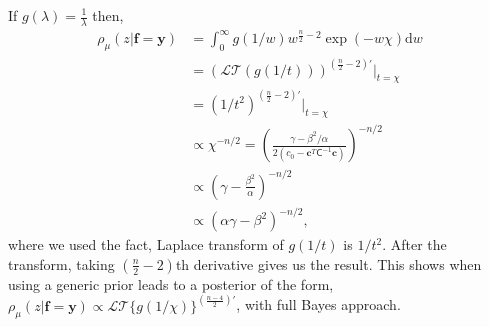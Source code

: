 \documentclass{iitthesis}          %
\newcommand{\bm}[1]{\boldsymbol{#1}}
\newcommand{\D}[1]{\text{d}{#1}}
\newcommand{\vc}{\bm{c}}
\newcommand{\vf}{\bm{f}}
\newcommand{\vy}{\bm{y}}
\newcommand{\mC}{\mathsf{C}}
\begin{document}
If $\displaystyle g(\lambda) = \frac{1}{\lambda}$ then, 
\begin{align*}
{\rho_{\mu}(z | \vf = \vy)} 
&= \int_{0}^\infty g(1/w)  w^{\frac n2 -2}
\exp \left(  - w \chi \right)
\D w
\\
& = \displaystyle \left(\mathcal{LT}(g(1/t)) \right)^{(\frac n2 -2)'} \lvert_{t=\chi}
\\
& = \left(1/t^{2} \right)^{(\frac n2 -2)'} \lvert_{t=\chi}
\\
& \propto \chi^{-n/2} = \left( \frac{  \gamma - \beta^2/\alpha}{2(c_0  -\vc ^T \mC^{-1} \vc)} \right)^{-n/2}
\\
& \propto \left(\gamma - \frac{\beta^2}{\alpha}\right)^{-n/2}
\\
& \propto \left(\alpha \gamma - \beta^2\right)^{-n/2},
\end{align*}
where we used the fact, Laplace transform of $g(1/t)$ is $1/t^2$. After the transform, taking $(\frac n2 -2)$th derivative gives us the result. This shows when using a generic prior leads to a posterior of the form,
$ {\rho_{\mu}(z | \vf = \vy)}  \propto  \mathcal{LT} \{ g(1/\chi) \}^{(\frac{n-4}2)'} $, with full Bayes approach.
\end{document}
